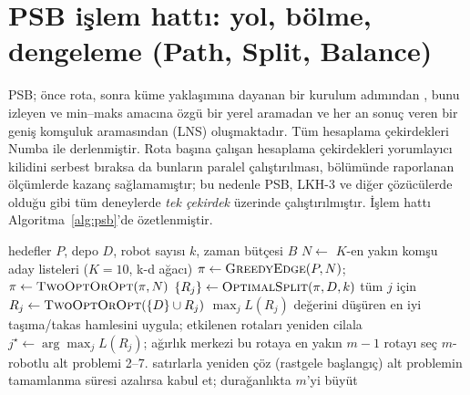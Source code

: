 \section{PSB işlem hattı: yol, bölme, dengeleme (Path, Split, Balance)}\label{sec:method}

PSB; önce rota, sonra küme yaklaşımına dayanan bir kurulum adımından \citep{beasley1983,prins2004},
bunu izleyen ve min--maks amacına özgü bir yerel aramadan ve her an sonuç veren bir geniş komşuluk
aramasından (LNS) oluşmaktadır. Tüm hesaplama çekirdekleri Numba \citep{lam2015numba} ile derlenmiştir. Rota başına
çalışan hesaplama çekirdekleri yorumlayıcı kilidini serbest bıraksa da bunların paralel çalıştırılması,
 bölümünde raporlanan ölçümlerde kazanç sağlamamıştır; bu nedenle PSB, LKH-3 ve diğer
çözücülerde olduğu gibi tüm deneylerde \emph{tek çekirdek} üzerinde çalıştırılmıştır. İşlem hattı Algoritma~\ref{alg:psb}'de
özetlenmiştir.

\begin{algorithm}[t]
\caption{Her an sonuç veren LNS ile PSB (Path--Split--Balance)}\label{alg:psb}
\begin{algorithmic}[1]
\Require hedefler $P$, depo $D$, robot sayısı $k$, zaman bütçesi $B$
\State $N \gets$ $K$-en yakın komşu aday listeleri ($K=10$, k-d ağacı)
\State $\pi \gets \textsc{GreedyEdge}(P,N)$; \; $\pi\gets\textsc{TwoOptOrOpt}(\pi,N)$ 
\State $\{R_j\} \gets \textsc{OptimalSplit}(\pi, D, k)$ 
\State tüm $j$ için $R_j \gets \textsc{TwoOptOrOpt}(\{D\}\cup R_j)$ 
\Repeat {}
  \State $\max_j L(R_j)$ değerini düşüren en iyi taşıma/takas hamlesini uygula; etkilenen rotaları yeniden cilala
 
  \State $j^\star\gets\arg\max_j L(R_j)$; ağırlık merkezi bu rotaya en yakın $m-1$ rotayı seç
  \State $m$-robotlu alt problemi 2--7. satırlarla yeniden çöz (rastgele başlangıç)
  \State alt problemin tamamlanma süresi azalırsa kabul et; durağanlıkta $m$'yi büyüt
\EndWhile
\end{algorithmic}
\end{algorithm}


